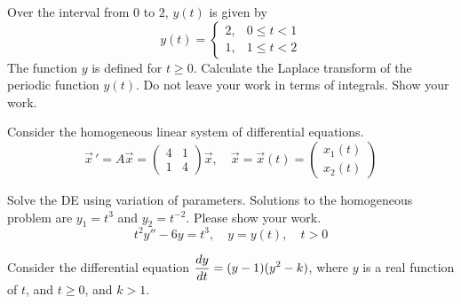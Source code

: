 \documentclass[12pt]{exam}
\begin{document}
\begin{questions}
        Over the interval from $0$ to $2$, $y(t)$ is given by $$y(t) = \begin{cases} 2, & 0 \le t < 1  \\  1 , & 1 \le t < 2 \end{cases}$$ The function $y$ is defined for $t \ge 0$. Calculate the Laplace transform of the periodic function $y(t)$. Do not leave your work in terms of integrals. Show your work. 
    
    \newpage 
    
    \newpage \Initials
    \question[8] Consider the homogeneous linear system of differential equations. $$\vec x \, ' = A \vec x =  \begin{pmatrix} 4&1\\1&4 \end{pmatrix} \vec x, \quad \vec x = \vec x(t) = \begin{pmatrix} x_1(t) \\ x_2(t) \end{pmatrix}$$
 	

    \newpage 
    
    \question[10] Solve the DE using variation of parameters. Solutions to the homogeneous problem are $y_1 = t^{3}$ and $y_2 = t^{-2}$. Please show your work. $$t^2y'' - 6y = t^3, \quad y=y(t), \quad t > 0$$    
    
    
    \newpage 
    
    

    

    
    \question[10] %
    Consider the differential equation $\displaystyle {\frac{dy}{dt}} = (y-1)(y^2-k)$, where $y$ is a real function of $t$, and $t \ge 0$, and $k>1$. 
    \begin{parts}

\end{parts}
\end{questions}
\end{document}
